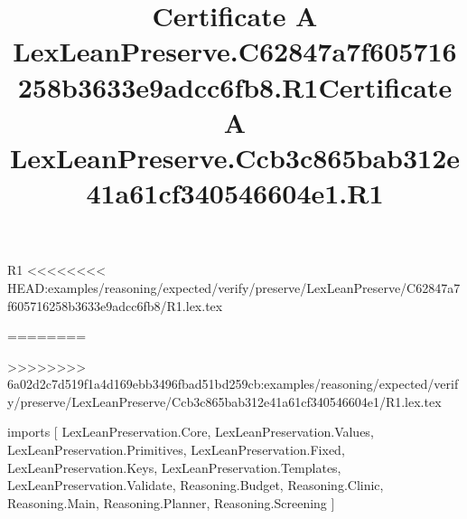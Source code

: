 \begin{lexlean}{R1}
<<<<<<<< HEAD:examples/reasoning/expected/verify/preserve/LexLeanPreserve/C62847a7f605716258b3633e9adcc6fb8/R1.lex.tex
\title{Certificate A LexLeanPreserve.C62847a7f605716258b3633e9adcc6fb8.R1}
========
\title{Certificate A LexLeanPreserve.Ccb3c865bab312e41a61cf340546604e1.R1}
>>>>>>>> 6a02d2c7d519f1a4d169ebb3496fbad51bd259cb:examples/reasoning/expected/verify/preserve/LexLeanPreserve/Ccb3c865bab312e41a61cf340546604e1/R1.lex.tex
\begin{coremodule}
imports [
  LexLeanPreservation.Core,
  LexLeanPreservation.Values,
  LexLeanPreservation.Primitives,
  LexLeanPreservation.Fixed,
  LexLeanPreservation.Keys,
  LexLeanPreservation.Templates,
  LexLeanPreservation.Validate,
  Reasoning.Budget,
  Reasoning.Clinic,
  Reasoning.Main,
  Reasoning.Planner,
  Reasoning.Screening
]


\end{coremodule}
\end{lexlean}
